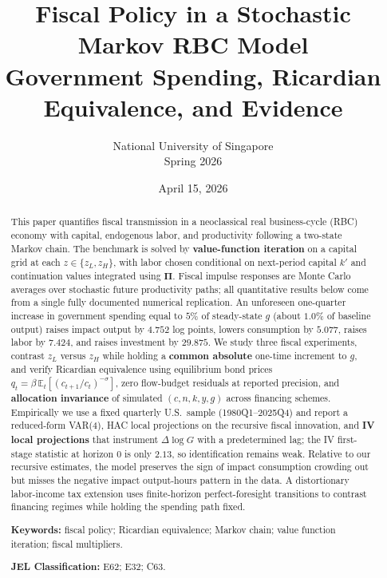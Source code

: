 \documentclass[11pt,a4paper]{article}
\title{\textbf{Fiscal Policy in a Stochastic Markov RBC Model}\\[0.35em]
  \large Government Spending, Ricardian Equivalence, and Evidence}
\author{National University of Singapore\\Spring 2026}
\date{April 15, 2026}
\begin{document}
\maketitle

\begin{abstract}
\noindent
This paper quantifies fiscal transmission in a neoclassical real business-cycle (RBC) economy with capital, endogenous labor, and productivity following a two-state Markov chain. The benchmark is solved by \textbf{value-function iteration} on a capital grid at each $z\in\{z_L,z_H\}$, with labor chosen conditional on next-period capital $k'$ and continuation values integrated using $\bm{\Pi}$. Fiscal impulse responses are Monte Carlo averages over stochastic future productivity paths; all quantitative results below come from a single fully documented numerical replication. An unforeseen one-quarter increase in government spending equal to $5\%$ of steady-state $g$ (about $1.0\%$ of baseline output) raises impact output by $4.752$ log points, lowers consumption by $5.077$, raises labor by $7.424$, and raises investment by $29.875$. We study three fiscal experiments, contrast $z_L$ versus $z_H$ while holding a \textbf{common absolute} one-time increment to $g$, and verify Ricardian equivalence using equilibrium bond prices $q_t=\beta\,\mathbb{E}_t[(c_{t+1}/c_t)^{-\sigma}]$, zero flow-budget residuals at reported precision, and \textbf{allocation invariance} of simulated $(c,n,k,y,g)$ across financing schemes. Empirically we use a fixed quarterly U.S.\ sample (1980Q1--2025Q4) and report a reduced-form VAR(4), HAC local projections on the recursive fiscal innovation, and \textbf{IV local projections} that instrument $\Delta\log G$ with a predetermined lag; the IV first-stage statistic at horizon $0$ is only $2.13$, so identification remains weak. Relative to our recursive estimates, the model preserves the sign of impact consumption crowding out but misses the negative impact output-hours pattern in the data. A distortionary labor-income tax extension uses finite-horizon perfect-foresight transitions to contrast financing regimes while holding the spending path fixed.
\vspace{0.6em}

\noindent\textbf{Keywords:} fiscal policy; Ricardian equivalence; Markov chain; value function iteration; fiscal multipliers.

\noindent\textbf{JEL Classification:} E62; E32; C63.
\end{abstract}

\onehalfspacing
\end{document}

